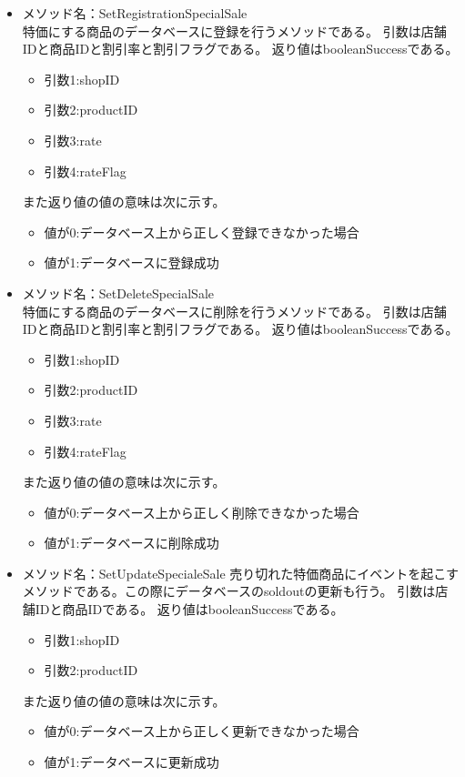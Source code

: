 \documentclass[a4j]{jarticle}
\begin{document}
\begin{itemize}
\item メソッド名：SetRegistrationSpecialSale\\
特価にする商品のデータベースに登録を行うメソッドである。
引数は店舗IDと商品IDと割引率と割引フラグである。
返り値はbooleanSuccessである。
	\begin{itemize}
		\item 引数1:shopID
		\item 引数2:productID
		\item 引数3:rate
		\item 引数4:rateFlag
	\end{itemize}
また返り値の値の意味は次に示す。
	\begin{itemize}
		\item 値が0:データベース上から正しく登録できなかった場合
		\item 値が1:データベースに登録成功
	\end{itemize}
%
\item メソッド名：SetDeleteSpecialSale\\
特価にする商品のデータベースに削除を行うメソッドである。
引数は店舗IDと商品IDと割引率と割引フラグである。
返り値はbooleanSuccessである。
	\begin{itemize}
		\item 引数1:shopID
		\item 引数2:productID
		\item 引数3:rate
		\item 引数4:rateFlag
	\end{itemize}
また返り値の値の意味は次に示す。
	\begin{itemize}
		\item 値が0:データベース上から正しく削除できなかった場合
		\item 値が1:データベースに削除成功
	\end{itemize}
%
\item メソッド名：SetUpdateSpecialeSale
売り切れた特価商品にイベントを起こすメソッドである。この際にデータベースのsoldoutの更新も行う。
引数は店舗IDと商品IDである。
返り値はbooleanSuccessである。
	\begin{itemize}
		\item 引数1:shopID
		\item 引数2:productID

	\end{itemize}
また返り値の値の意味は次に示す。
	\begin{itemize}
		\item 値が0:データベース上から正しく更新できなかった場合
		\item 値が1:データベースに更新成功
	\end{itemize}
\end{itemize}
\end{document}

